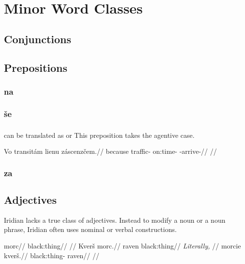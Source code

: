 \chapter{Minor Word Classes}\label{chap:minor}

\section{Conjunctions}

\section{Prepositions}

\subsection{na}

\subsection{\v{s}e}

\subsection{}

 can be translated as  or  This preposition takes the agentive case.

\pex
\begingl
\gla Vo transit\'am lienu z\'ascenz\v{c}em.//
\glb because traffic- on:time- -arrive-//
\glft {}//
\endgl
\xe

\subsection{za}

\section{Adjectives}
Iridian lacks a true class of adjectives. Instead to modify a noun or a noun phrase, Iridian often uses nominal or verbal constructions.

\pex
\a
\begingl
\gla morc//
\glb black:thing//
\glft {}//
\endgl
\a
\begingl
\gla Kver\v{s} morc.//
\glb raven black:thing//
\glft {} \emph{Literally,} //
\endgl
\a
\begingl
\gla morcie kver\v{s}.//
\glb black:thing- raven//
\glft {}//
\endgl
\xe

